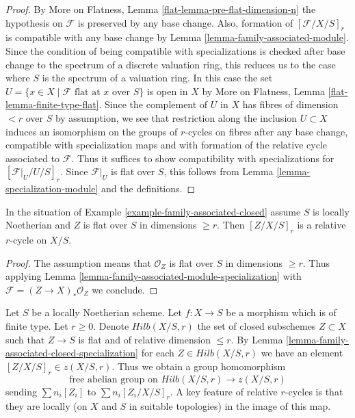 \begin{proof}
By More on Flatness, Lemma \ref{flat-lemma-pre-flat-dimension-n}
the hypothesis on $\mathcal{F}$ is preserved by any base change.
Also, formation of $[\mathcal{F}/X/S]_r$ is compatible with any
base change by Lemma \ref{lemma-family-associated-module}.
Since the condition of being compatible with specializations
is checked after base change to the spectrum of a discrete valuation ring,
this reduces us to the case where $S$ is the spectrum of a valuation ring.
In this case the set
$U = \{x \in X \mid \mathcal{F}\text{ flat at }x\text{ over }S\}$
is open in $X$ by
More on Flatness, Lemma \ref{flat-lemma-finite-type-flat}.
Since the complement of $U$ in $X$ has fibres of dimension $< r$ over
$S$ by assumption, we see that restriction along the inclusion
$U \subset X$ induces an isomorphism on the groups of $r$-cycles
on fibres after any base change, compatible with specialization maps
and with formation of the relative cycle associated to $\mathcal{F}$.
Thus it suffices to show compatibility with
specializations for $[\mathcal{F}|_U / U /S]_r$.
Since $\mathcal{F}|_U$ is flat over $S$, this follows from
Lemma \ref{lemma-specialization-module} and the definitions.
\end{proof}

\begin{lemma}
\label{lemma-family-associated-closed-specialization}
In the situation of Example \ref{example-family-associated-closed}
assume $S$ is locally Noetherian and $Z$ is flat over $S$ in dimensions
$\geq r$. Then $[Z/X/S]_r$ is a relative $r$-cycle on $X/S$.
\end{lemma}

\begin{proof}
The assumption means that $\mathcal{O}_Z$ is flat over $S$ in
dimensions $\geq r$. Thus applying
Lemma \ref{lemma-family-associated-module-specialization}
with $\mathcal{F} = (Z \to X)_*\mathcal{O}_Z$ we conclude.
\end{proof}

\noindent
Let $S$ be a locally Noetherian scheme. Let $f : X \to S$ be a morphism
which is of finite type. Let $r \geq 0$. Denote $Hilb(X/S, r)$
the set of closed subschemes $Z \subset X$ such that $Z \to S$ is flat
and of relative dimension $\leq r$. By
Lemma \ref{lemma-family-associated-closed-specialization} for each
$Z \in Hilb(X/S, r)$ we have an element $[Z/X/S]_r \in z(X/S, r)$.
Thus we obtain a group homomorphism
\begin{equation}
\label{equation-cycle-classes}
\text{free abelian group on }Hilb(X/S, r) \longrightarrow z(X/S, r)
\end{equation}
sending $\sum n_i[Z_i]$ to $\sum n_i[Z_i/X/S]_r$.
A key feature of relative $r$-cycles is that they are locally
(on $X$ and $S$ in suitable topologies) in the image of this map.

